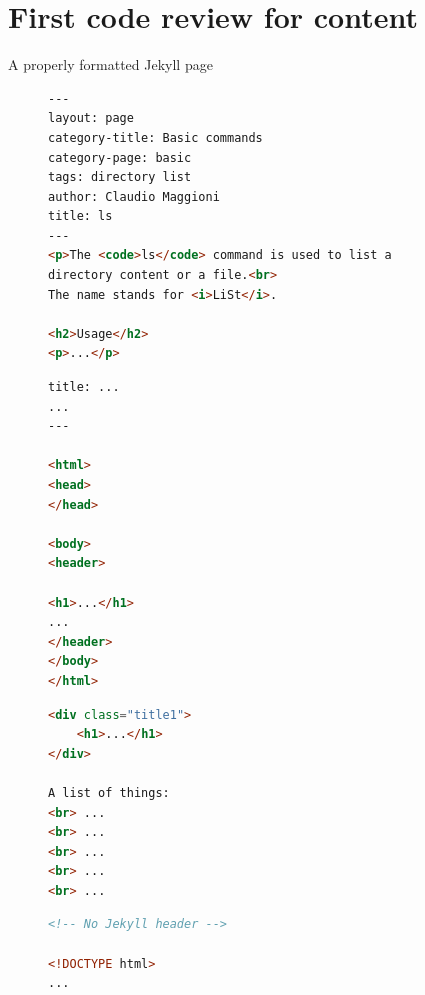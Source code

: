 \documentclass[10pt]{beamer}
\begin{document}
\section{First code review for content}

\begin{frame}[fragile]{A properly formatted Jekyll page}
\begin{figure}[h]
\begin{lstlisting}[language=html,basicstyle=\small\ttfamily]
---
layout: page
category-title: Basic commands
category-page: basic
tags: directory list
author: Claudio Maggioni
title: ls
---
<p>The <code>ls</code> command is used to list a
directory content or a file.<br>
The name stands for <i>LiSt</i>.

<h2>Usage</h2>
<p>...</p>
\end{lstlisting}
\end{figure}
\end{frame}

{
\begin{frame}
\end{frame}}

\begin{frame}[fragile]
\begin{figure}[h]
\begin{lstlisting}[language=html]
title: ...
...
---

<html>
<head>
</head>

<body>
<header>

<h1>...</h1>
...
</header>
</body>
</html>
\end{lstlisting}
\end{figure}
\end{frame}

\begin{frame}[fragile]
\begin{figure}[h]
\begin{lstlisting}[language=html]
<div class="title1">
    <h1>...</h1>
</div>

A list of things:
<br> ...
<br> ...
<br> ...
<br> ...
<br> ...
\end{lstlisting}
\end{figure}
\end{frame}

\begin{frame}[fragile]
\begin{figure}[h]
\begin{lstlisting}[language=html]
<!-- No Jekyll header -->

<!DOCTYPE html>
...
\end{lstlisting}
\end{figure}
\end{frame}
\end{document}
